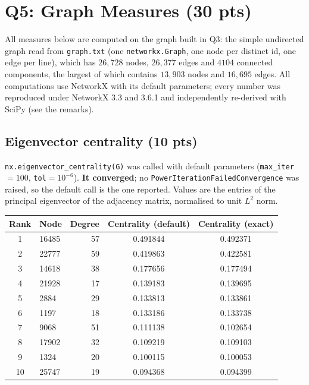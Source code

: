 \section{Q5: Graph Measures (30 pts)}

All measures below are computed on the graph built in Q3: the simple undirected
graph read from \texttt{graph.txt} (one \texttt{networkx.Graph}, one node per
distinct id, one edge per line), which has $26{,}728$ nodes, $26{,}377$ edges and
$4104$ connected components, the largest of which contains $13{,}903$ nodes and
$16{,}695$ edges. All computations use NetworkX with its default parameters; every
number was reproduced under NetworkX 3.3 and 3.6.1 and independently re-derived
with SciPy (see the remarks).

\subsection{Eigenvector centrality (10 pts)}

\texttt{nx.eigenvector\_centrality(G)} was called with default parameters
(\texttt{max\_iter}$=100$, \texttt{tol}$=10^{-6}$). \textbf{It converged}; no
\texttt{PowerIterationFailedConvergence} was raised, so the default call is the
one reported. Values are the entries of the principal eigenvector of the adjacency
matrix, normalised to unit $L^2$ norm.

\begin{table}[H]
\centering
\begin{tabular}{clrcc}
\toprule
Rank & Node & Degree & Centrality (default) & Centrality (exact) \\
\midrule
1  & 16485 & 57 & 0.491844 & 0.492371 \\
2  & 22777 & 59 & 0.419863 & 0.422581 \\
3  & 14618 & 38 & 0.177656 & 0.177494 \\
4  & 21928 & 17 & 0.139183 & 0.139695 \\
5  & 2884  & 29 & 0.133813 & 0.133861 \\
6  & 1197  & 18 & 0.133186 & 0.133738 \\
7  & 9068  & 51 & 0.111138 & 0.102654 \\
8  & 17902 & 32 & 0.109219 & 0.109103 \\
9  & 1324  & 20 & 0.100115 & 0.100053 \\
10 & 25747 & 19 & 0.094368 & 0.094399 \\
\bottomrule
\end{tabular}
\label{p3:tab:eig}
\end{table}

